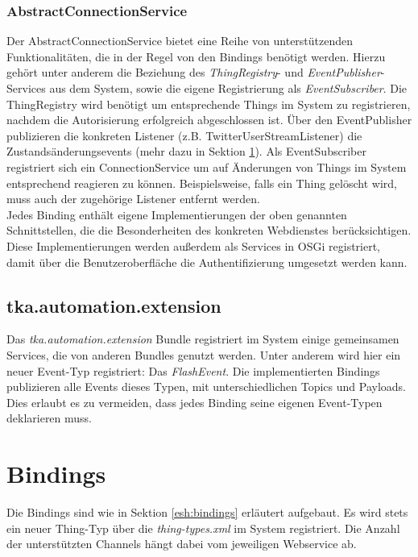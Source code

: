 \subsubsection{AbstractConnectionService}
Der AbstractConnectionService bietet eine Reihe von unterstützenden Funktionalitäten, die in der Regel von den Bindings benötigt werden. Hierzu gehört unter anderem die Beziehung des \textit{ThingRegistry}- und \textit{EventPublisher}-Services aus dem System, sowie die eigene Registrierung als \textit{EventSubscriber}. Die ThingRegistry wird benötigt um entsprechende Things im System zu registrieren, nachdem die Autorisierung erfolgreich abgeschlossen ist. Über den EventPublisher publizieren die konkreten Listener (z.B. TwitterUserStreamListener) die Zustandsänderungsevents (mehr dazu in Sektion \ref{sec:bindings_impl}). Als EventSubscriber registriert sich ein ConnectionService um auf Änderungen von Things im System entsprechend reagieren zu können. Beispielsweise, falls ein Thing gelöscht wird, muss auch der zugehörige Listener entfernt werden.\\



Jedes Binding enthält eigene Implementierungen der oben genannten Schnittstellen, die die Besonderheiten des konkreten Webdienstes berücksichtigen. Diese Implementierungen werden außerdem als Services in OSGi registriert, damit über die Benutzeroberfläche die Authentifizierung umgesetzt werden kann.


\subsection{tka.automation.extension}
Das \textit{tka.automation.extension} Bundle registriert im System einige gemeinsamen Services, die von anderen Bundles genutzt werden. Unter anderem wird hier ein neuer Event-Typ registriert: Das \textit{FlashEvent}. Die implementierten Bindings publizieren alle Events dieses Typen, mit unterschiedlichen Topics und Payloads. Dies erlaubt es zu vermeiden, dass jedes Binding seine eigenen Event-Typen deklarieren muss. 


\section{Bindings}
\label{sec:bindings_impl}
Die Bindings sind wie in Sektion \ref{esh:bindings} erläutert aufgebaut. Es wird stets ein neuer Thing-Typ über die \textit{thing-types.xml} im System registriert. Die Anzahl der unterstützten Channels hängt dabei vom jeweiligen Webservice ab.

